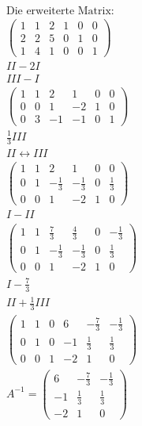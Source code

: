 \begin{align*}
    \text{Die erweiterte Matrix:}                          \\
    \begin{pmatrix}
        1 & 1 & 2 & 1 & 0 & 0 \\
        2 & 2 & 5 & 0 & 1 & 0 \\
        1 & 4 & 1 & 0 & 0 & 1
    \end{pmatrix}                                  \\
    II - 2I                                                \\
    III - I                                                \\
    \begin{pmatrix}
        1 & 1 & 2  & 1  & 0 & 0 \\
        0 & 0 & 1  & -2 & 1 & 0 \\
        0 & 3 & -1 & -1 & 0 & 1
    \end{pmatrix}                                \\
    \frac{1}{3}III                                         \\
    II \leftrightarrow III                                 \\
    \begin{pmatrix}
        1 & 1 & 2            & 1            & 0 & 0           \\
        0 & 1 & -\frac{1}{3} & -\frac{1}{3} & 0 & \frac{1}{3} \\
        0 & 0 & 1            & -2           & 1 & 0
    \end{pmatrix}  \\
    I - II                                                 \\
    \begin{pmatrix}
        1 & 1 & \frac{7}{3}  & \frac{4}{3}  & 0 & -\frac{1}{3} \\
        0 & 1 & -\frac{1}{3} & -\frac{1}{3} & 0 & \frac{1}{3}  \\
        0 & 0 & 1            & -2           & 1 & 0
    \end{pmatrix} \\
    I - \frac{7}{3}                                        \\
    II + \frac{1}{3}III                                    \\
    \begin{pmatrix}
        1 & 1 & 0 & 6  & -\frac{7}{3} & -\frac{1}{3} \\
        0 & 1 & 0 & -1 & \frac{1}{3}  & \frac{1}{3}  \\
        0 & 0 & 1 & -2 & 1            & 0
    \end{pmatrix}           \\
    A^{-1} = \begin{pmatrix}
                 6  & -\frac{7}{3} & -\frac{1}{3} \\
                 -1 & \frac{1}{3}  & \frac{1}{3}  \\
                 -2 & 1            & 0
             \end{pmatrix}
\end{align*}

